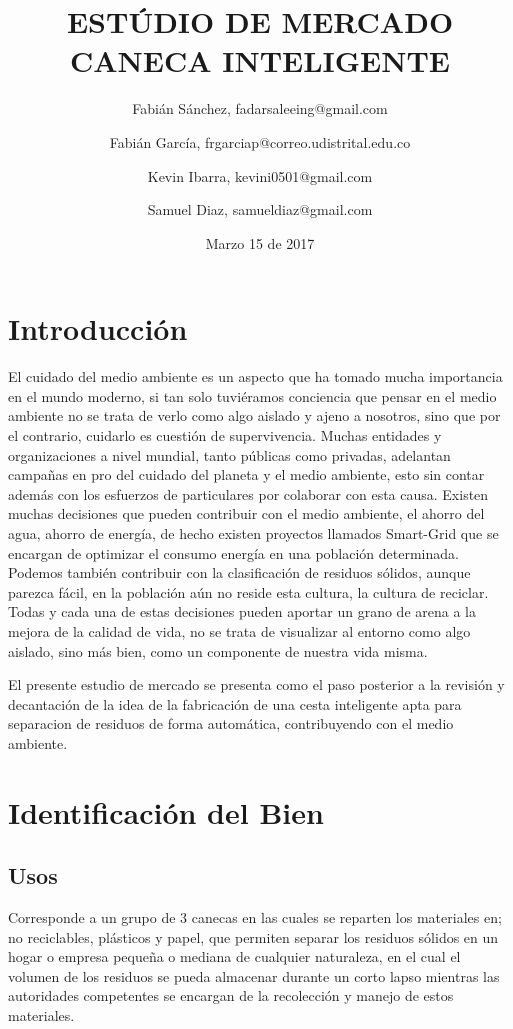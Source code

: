 \documentclass[letterpaper,12pt]{scrreprt}
\title{ESTÚDIO DE MERCADO CANECA INTELIGENTE}
\author{Fabián Sánchez, fadarsaleeing@gmail.com \and Fabián García, frgarciap@correo.udistrital.edu.co \and Kevin Ibarra, kevini0501@gmail.com \and Samuel Diaz, samueldiaz@gmail.com}
\date{Marzo 15 de 2017}
\begin{document}
\maketitle


 \tableofcontents

\chapter{Introducción}
    El cuidado del medio ambiente es un aspecto que ha tomado mucha importancia en el mundo moderno, si tan solo tuviéramos conciencia que pensar en el medio ambiente no se trata de verlo como algo aislado y ajeno a nosotros, sino que por el contrario, cuidarlo es cuestión de supervivencia. Muchas entidades y organizaciones a nivel mundial, tanto públicas como privadas, adelantan campañas en pro del cuidado del planeta y el medio ambiente, esto sin contar además con los esfuerzos de particulares por colaborar con esta causa. 
    Existen muchas decisiones que pueden contribuir con el medio ambiente, el ahorro del agua,  ahorro de energía, de hecho existen proyectos llamados Smart-Grid que se encargan de optimizar el consumo energía en una población determinada. Podemos también contribuir con la clasificación de residuos sólidos, aunque parezca fácil, en la población aún no reside esta cultura, la cultura de reciclar.
    Todas y cada una de estas decisiones pueden aportar un grano de arena a la mejora de la calidad de vida,  no se trata de visualizar al entorno como algo aislado, sino más bien, como un componente de nuestra vida misma. 


    El presente estudio de mercado se presenta como el paso posterior a la revisión y decantación de la idea de la fabricación de una cesta inteligente apta para  separacion de residuos de forma automática, contribuyendo con el medio ambiente.

\chapter{Identificación del Bien}

    \section{Usos}
    Corresponde a un grupo de 3 canecas en las cuales se reparten los materiales en; no reciclables, plásticos y papel, que permiten separar los residuos sólidos en un hogar o empresa pequeña o mediana de cualquier naturaleza, en el cual el volumen de los residuos se pueda almacenar durante un corto lapso mientras las autoridades competentes se encargan de la recolección y manejo de estos materiales.
\end{document}
